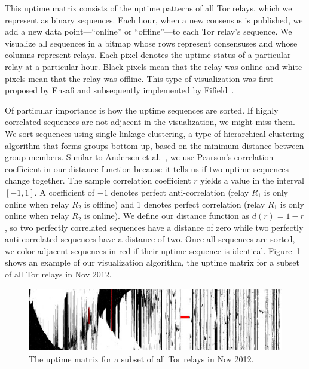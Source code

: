 This uptime matrix consists of the uptime patterns of all Tor relays, which we
represent as binary sequences.  Each hour, when a new consensus is published, we
add a new data point---``online'' or ``offline''---to each Tor relay's sequence.
We visualize all sequences in a bitmap whose rows represent consensuses and
whose columns represent relays.  Each pixel denotes the uptime status of a
particular relay at a particular hour.  Black pixels mean that the relay was
online and white pixels mean that the relay was offline.  This type of
visualization was first proposed by Ensafi and subsequently implemented by
Fifield~\cite{Fifield2014a}.

Of particular importance is how the uptime sequences are sorted.  If highly
correlated sequences are not adjacent in the visualization, we might miss them.
We sort sequences using single-linkage clustering, a type of hierarchical
clustering algorithm that forms groups bottom-up, based on the minimum distance
between group members.  Similar to Andersen et al.~\cite{Andersen2002a}, we use
Pearson's correlation coefficient in our distance function because it tells us
if two uptime sequences change together.  The sample correlation coefficient $r$
% 
% 
yields a value in the interval $[-1, 1]$.
A coefficient of $-1$ denotes perfect anti-correlation
(relay $R_1$ is only online when relay $R_2$ is offline) and 1 denotes perfect
correlation (relay $R_1$ is only online when relay $R_2$ is online).  We define
our distance function as $d(r) = 1 - r$, so two perfectly correlated sequences
have a distance of zero while two perfectly anti-correlated sequences have a
distance of two.  Once all sequences are sorted, we color adjacent sequences in
red if their uptime sequence is identical.  Figure~\ref{fig:uptime-matrix} shows
an example of our visualization algorithm, the uptime matrix for a subset of all
Tor relays in Nov 2012.

\begin{figure}[t]
	\centering
	\includegraphics[width=\linewidth]{diagrams/2012-11.jpg}
	\caption{The uptime matrix for a subset of all Tor relays in Nov 2012.}
	\label{fig:uptime-matrix}
\end{figure}

